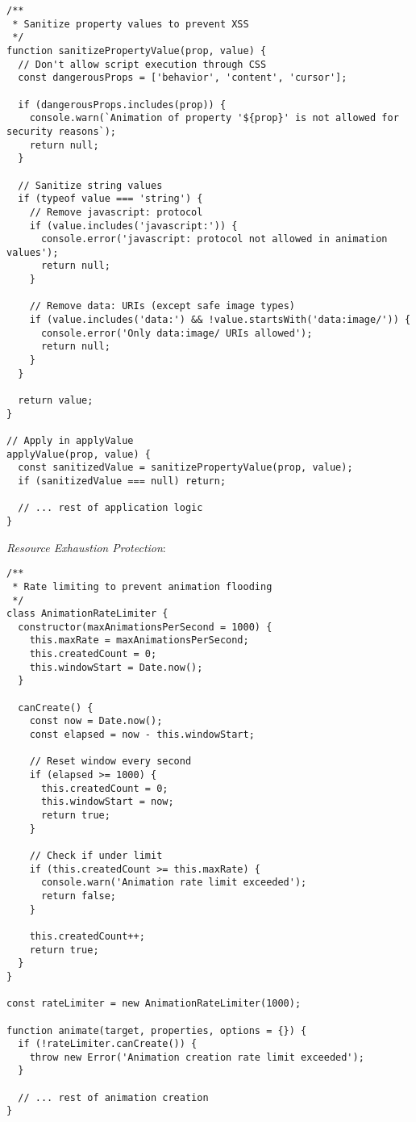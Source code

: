 \documentclass[11pt]{article}
\begin{document}
\begin{verbatim}
/**
 * Sanitize property values to prevent XSS
 */
function sanitizePropertyValue(prop, value) {
  // Don't allow script execution through CSS
  const dangerousProps = ['behavior', 'content', 'cursor'];
  
  if (dangerousProps.includes(prop)) {
    console.warn(`Animation of property '${prop}' is not allowed for security reasons`);
    return null;
  }
  
  // Sanitize string values
  if (typeof value === 'string') {
    // Remove javascript: protocol
    if (value.includes('javascript:')) {
      console.error('javascript: protocol not allowed in animation values');
      return null;
    }
    
    // Remove data: URIs (except safe image types)
    if (value.includes('data:') && !value.startsWith('data:image/')) {
      console.error('Only data:image/ URIs allowed');
      return null;
    }
  }
  
  return value;
}

// Apply in applyValue
applyValue(prop, value) {
  const sanitizedValue = sanitizePropertyValue(prop, value);
  if (sanitizedValue === null) return;
  
  // ... rest of application logic
}
\end{verbatim}

\emph{Resource Exhaustion Protection}:

\begin{verbatim}
/**
 * Rate limiting to prevent animation flooding
 */
class AnimationRateLimiter {
  constructor(maxAnimationsPerSecond = 1000) {
    this.maxRate = maxAnimationsPerSecond;
    this.createdCount = 0;
    this.windowStart = Date.now();
  }
  
  canCreate() {
    const now = Date.now();
    const elapsed = now - this.windowStart;
    
    // Reset window every second
    if (elapsed >= 1000) {
      this.createdCount = 0;
      this.windowStart = now;
      return true;
    }
    
    // Check if under limit
    if (this.createdCount >= this.maxRate) {
      console.warn('Animation rate limit exceeded');
      return false;
    }
    
    this.createdCount++;
    return true;
  }
}

const rateLimiter = new AnimationRateLimiter(1000);

function animate(target, properties, options = {}) {
  if (!rateLimiter.canCreate()) {
    throw new Error('Animation creation rate limit exceeded');
  }
  
  // ... rest of animation creation
}
\end{verbatim}
\end{document}
